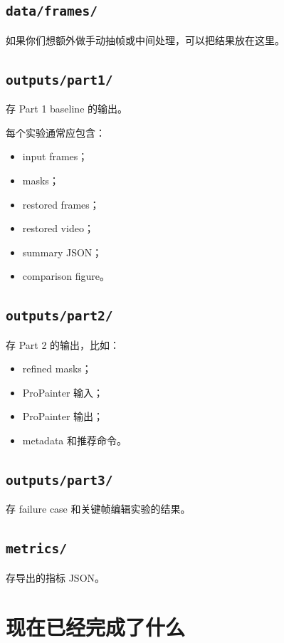 \documentclass[11pt,a4paper,fontset=none]{ctexart}
\begin{document}
\subsection{\texttt{data/frames/}}

如果你们想额外做手动抽帧或中间处理，可以把结果放在这里。

\subsection{\texttt{outputs/part1/}}

存 Part 1 baseline 的输出。

每个实验通常应包含：

\begin{itemize}
  \item input frames；
  \item masks；
  \item restored frames；
  \item restored video；
  \item summary JSON；
  \item comparison figure。
\end{itemize}

\subsection{\texttt{outputs/part2/}}

存 Part 2 的输出，比如：

\begin{itemize}
  \item refined masks；
  \item ProPainter 输入；
  \item ProPainter 输出；
  \item metadata 和推荐命令。
\end{itemize}

\subsection{\texttt{outputs/part3/}}

存 failure case 和关键帧编辑实验的结果。

\subsection{\texttt{metrics/}}

存导出的指标 JSON。

\section{现在已经完成了什么}
\end{document}
